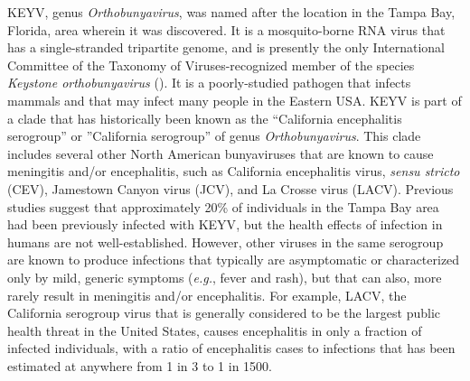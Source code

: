 \documentclass[12pt]{article}
\newcommand{\eg}{\textit{e.g.}}
\begin{document}
        KEYV, genus \emph{Orthobunyavirus}, was named after the location in the Tampa Bay, Florida, area wherein it was discovered. It is a mosquito-borne RNA virus that has a single-stranded tripartite genome, and is presently the only International Committee of the Taxonomy of Viruses-recognized member of the species \emph{Keystone orthobunyavirus} (\cite{abudurexiti2019taxonomy}). %
        It is a poorly-studied pathogen that infects mammals and that may infect many people in the Eastern USA. KEYV is part of a clade that has historically been known as the ``California encephalitis serogroup'' or ''California serogroup'' of genus \emph{Orthobunyavirus}. This clade includes several other North American bunyaviruses that are known to cause meningitis and/or encephalitis, such as California encephalitis virus, \textit{sensu stricto} (CEV), Jamestown Canyon virus (JCV), and La Crosse virus (LACV). Previous studies suggest that approximately 20\% of individuals in the Tampa Bay area had been previously infected with KEYV\cite{parkin1972review}, but the health effects of infection in humans are not well-established. However, other viruses in the same serogroup are known to produce infections that typically are asymptomatic or characterized only by mild, generic symptoms (\eg, fever and rash), but that can also, more rarely result in meningitis and/or encephalitis. For example, LACV, the California serogroup virus that is generally considered to be the largest public health threat in the United States, causes encephalitis in only a fraction of infected individuals, with a ratio of encephalitis cases to infections that has been estimated at anywhere from 1 in 3 to 1 in 1500\cite{rust1999topical}. %

\end{document}

